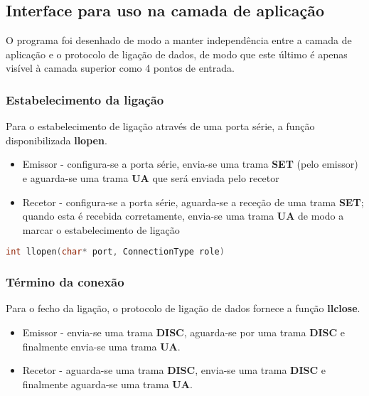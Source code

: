 \subsection{Interface para uso na camada de aplicação}

O programa foi desenhado de modo a manter independência entre a camada de aplicação e o protocolo de ligação de dados, de modo que este último é apenas visível à camada superior como 4 pontos de entrada.

\subsubsection{Estabelecimento da ligação}

Para o estabelecimento de ligação através de uma porta série, a função disponibilizada \textbf{llopen}. 

\begin{itemize}
    \item Emissor - configura-se a porta série, envia-se uma trama \textbf{SET} (pelo emissor) e aguarda-se uma trama \textbf{UA} que será enviada pelo recetor
    \item Recetor - configura-se a porta série, aguarda-se a receção de uma trama \textbf{SET}; quando esta é recebida corretamente, envia-se uma trama \textbf{UA} de modo a marcar o estabelecimento de ligação
\end{itemize}

\begin{lstlisting}[language=C, caption=llopen header]
int llopen(char* port, ConnectionType role)
\end{lstlisting}

\subsubsection{Término da conexão}

Para o fecho da ligação, o protocolo de ligação de dados fornece a função \textbf{llclose}.

\begin{itemize}
    \item Emissor - envia-se uma trama \textbf{DISC}, aguarda-se por uma trama \textbf{DISC} e finalmente envia-se uma trama \textbf{UA}.
    \item Recetor - aguarda-se uma trama \textbf{DISC}, envia-se uma trama \textbf{DISC} e finalmente aguarda-se uma trama \textbf{UA}.
\end{itemize}


